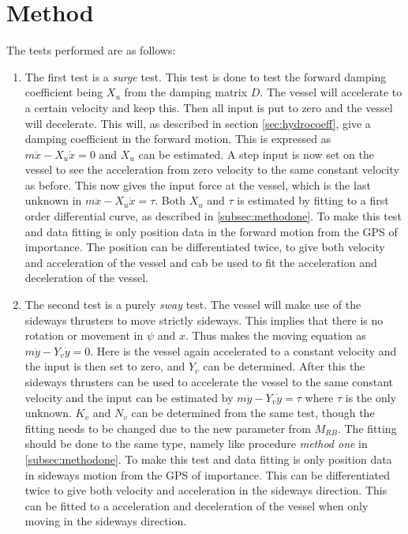 \section{Method}
The tests performed are as follows:
\begin{enumerate}
	\item The first test is a \textit{surge} test. This test is done to test the forward damping coefficient being $X_u$ from the damping matrix $D$. The vessel will accelerate to a certain velocity and keep this. Then all input is put to zero and the vessel will decelerate. This will, as described in section \ref{sec:hydrocoeff}, give a damping coefficient in the forward motion. This is expressed as $m \ddot x - X_u \dot x = 0$ and $X_u$ can be estimated. A step input is now set on the vessel to see the acceleration from zero velocity to the same constant velocity as before. This now gives the input force at the vessel, which is the last unknown in $m \ddot x - X_u \dot x = \tau$. Both $X_u$ and $\tau$ is estimated by fitting to a first order differential curve, as described in \ref{subsec:methodone}. To make this test and data fitting is only position data in the forward motion from the \ac{GPS} of importance. The position can be differentiated twice, to give both velocity and acceleration of the vessel and cab be used to fit the acceleration and deceleration of the vessel.
	\item The second test is a purely \textit{sway} test. The vessel will make use of the sideways thrusters to move strictly sideways. This implies that there is no rotation or movement in $\psi$ and $x$. Thus makes the moving equation as $m \ddot y - Y_v \dot y = 0$. Here is the vessel again accelerated to a constant velocity and the input is then set to zero, and $Y_v$ can be determined. After this the sideways thrusters can be used to accelerate the vessel to the same constant velocity and the input can be estimated by $m \ddot y - Y_v \dot y = \tau$ where $\tau$ is the only unknown. $K_v$ and $N_v$ can be determined from the same test, though the fitting needs to be changed due to the new parameter from $M_{RB}$. The fitting should be done to the same type, namely like procedure \textit{method one} in \ref{subsec:methodone}. To make this test and data fitting is only position data in sideways motion from the \ac{GPS} of importance. This can be differentiated twice to give both velocity and acceleration in the sideways direction. This can be fitted to a acceleration and deceleration of the vessel when only moving in the sideways direction.

\end{enumerate}
